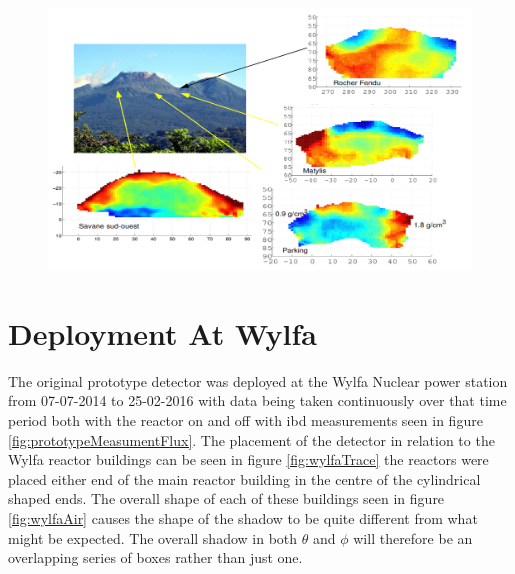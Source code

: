 \begin{figure}[H]
 \centering
 \includegraphics[width=1.0\linewidth]{Chapter5/Figs/Raster/diaphane_structuralImaging.png}
 \label{fig:diaphaneStructualImaging}
\end{figure}

\section{Deployment At Wylfa}\label{sec:deploymentAtWylfa}
The original prototype detector was deployed at the Wylfa Nuclear power station from 07-07-2014 to 25-02-2016 with data being taken continuously over that time period both with the reactor on and off with ibd measurements seen in figure \ref{fig:prototypeMeasumentFlux}. The placement of the detector in relation to the Wylfa reactor buildings can be seen in figure \ref{fig:wylfaTrace} the reactors were placed either end of the main reactor building in the centre of the cylindrical shaped ends. The overall shape of each of these buildings seen in figure \ref{fig:wylfaAir} causes the shape of the shadow to be quite different from what might be expected. The overall shadow in both $\theta$ and $\phi$ will therefore be an overlapping series of boxes rather than just one.   

